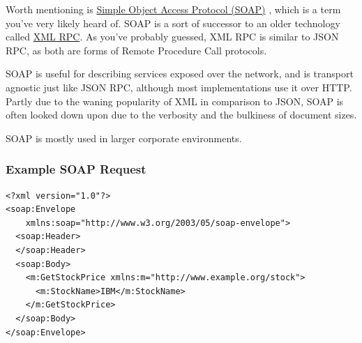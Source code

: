\documentclass{book}
\begin{document}
Worth mentioning is \href{https://en.wikipedia.org/wiki/SOAP}{Simple Object Access Protocol (SOAP)} \cite{SOAP}, which is a term you've very likely heard of. SOAP is a sort of successor to an older technology called \href{https://en.wikipedia.org/wiki/XML-RPC}{XML RPC}. As you've probably guessed, XML RPC is similar to JSON RPC, as both are forms of Remote Procedure Call protocols.

SOAP is useful for describing services exposed over the network, and is transport agnostic just like JSON RPC, although most implementations use it over HTTP. Partly due to the waning popularity of XML in comparison to JSON, SOAP is often looked down upon due to the verbosity and the bulkiness of document sizes.

SOAP is mostly used in larger corporate environments.

\subsubsection{Example SOAP Request}

\begin{verbatim}
<?xml version="1.0"?>
<soap:Envelope
    xmlns:soap="http://www.w3.org/2003/05/soap-envelope">
  <soap:Header>
  </soap:Header>
  <soap:Body>
    <m:GetStockPrice xmlns:m="http://www.example.org/stock">
      <m:StockName>IBM</m:StockName>
    </m:GetStockPrice>
  </soap:Body>
</soap:Envelope>
\end{verbatim}



\end{document}
